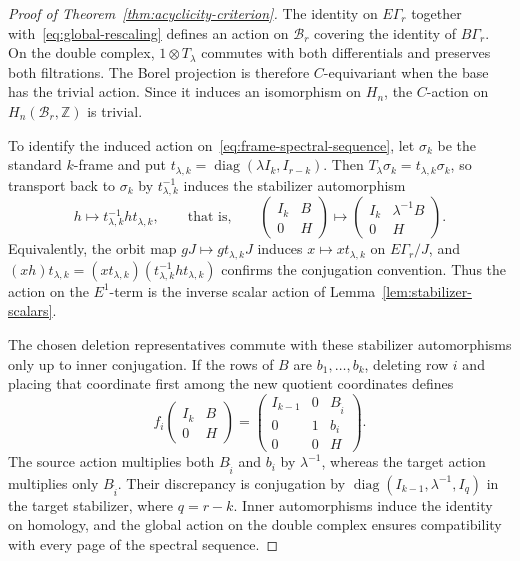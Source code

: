 \documentclass[10pt,a4paper]{amsart}
\newcommand{\Z}{\mathbb Z}
\numberwithin{equation}{section}
\begin{document}
\begin{proof}[Proof of Theorem~\ref{thm:acyclicity-criterion}]
The identity on $E\Gamma_r$ together with~\eqref{eq:global-rescaling} defines an action on $\mathcal B_r$ covering the identity of $B\Gamma_r$. On the double complex, $1\otimes T_\lambda$ commutes with both differentials and preserves both filtrations. The Borel projection is therefore $C$-equivariant when the base has the trivial action. Since it induces an isomorphism on $H_n$, the $C$-action on $H_n(\mathcal B_r,\Z)$ is trivial.

To identify the induced action on~\eqref{eq:frame-spectral-sequence}, let $\sigma_k$ be the standard $k$-frame and put $t_{\lambda,k}=\operatorname{diag}(\lambda I_k,I_{r-k})$. Then $T_\lambda\sigma_k=t_{\lambda,k}\sigma_k$, so transport back to $\sigma_k$ by $t_{\lambda,k}^{-1}$ induces the stabilizer automorphism
$$
h\longmapsto t_{\lambda,k}^{-1}ht_{\lambda,k},\qquad\text{that is,}\qquad
 \begin{pmatrix}I_k&B\\0&H\end{pmatrix}
 \longmapsto\begin{pmatrix}I_k&\lambda^{-1}B\\0&H\end{pmatrix}.
$$
Equivalently, the orbit map $gJ\mapsto gt_{\lambda,k}J$ induces $x\mapsto xt_{\lambda,k}$ on $E\Gamma_r/J$, and $(xh)t_{\lambda,k}=(xt_{\lambda,k})(t_{\lambda,k}^{-1}ht_{\lambda,k})$ confirms the conjugation convention. Thus the action on the $E^1$-term is the inverse scalar action of Lemma~\ref{lem:stabilizer-scalars}.

The chosen deletion representatives commute with these stabilizer automorphisms only up to inner conjugation. If the rows of $B$ are $b_1,\ldots,b_k$, deleting row $i$ and placing that coordinate first among the new quotient coordinates defines
$$
f_i\begin{pmatrix}I_k&B\\0&H\end{pmatrix}
 =\begin{pmatrix}
 I_{k-1}&0&B_{\widehat i}\\
 0&1&b_i\\
 0&0&H
 \end{pmatrix}.
$$
The source action multiplies both $B_{\widehat i}$ and $b_i$ by $\lambda^{-1}$, whereas the target action multiplies only $B_{\widehat i}$. Their discrepancy is conjugation by $\operatorname{diag}(I_{k-1},\lambda^{-1},I_q)$ in the target stabilizer, where $q=r-k$. Inner automorphisms induce the identity on homology, and the global action on the double complex ensures compatibility with every page of the spectral sequence.


\end{proof}
\end{document}
